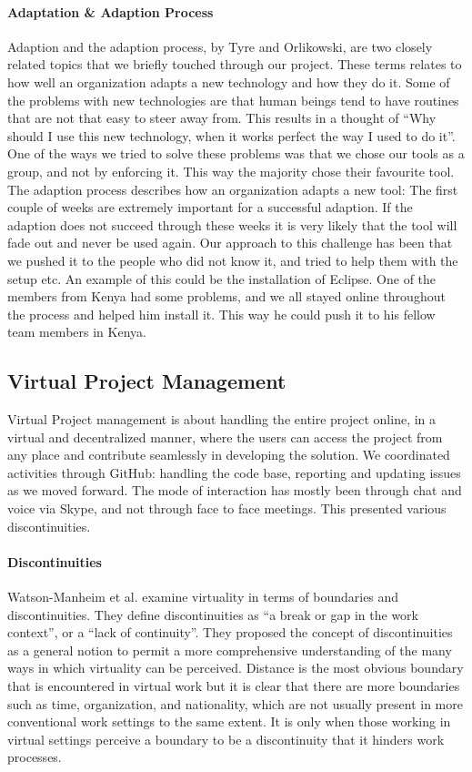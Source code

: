 \paragraph{Adaptation \& Adaption Process} \label{par:adaptationandadaptationprocess}
Adaption and the adaption process, by Tyre and Orlikowski, \cite{tyre1994windows} are two closely related topics that we briefly touched through our project. These terms relates to how well an organization adapts a new technology and how they do it. Some of the problems with new technologies are that human beings tend to have routines that are not that easy to steer away from. This results in a thought of ``Why should I use this new technology, when it works perfect the way I used to do it''. One of the ways we tried to solve these problems was that we chose our tools as a group, and not by enforcing it. This way the majority chose their favourite tool. The adaption process describes how an organization adapts a new tool: The first couple of weeks are extremely important for a successful adaption. If the adaption does not succeed through these weeks it is very likely that the tool will fade out and never be used again. Our approach to this challenge has been that we pushed it to the people who did not know it, and tried to help them with the setup etc. An example of this could be the installation of Eclipse. One of the members from Kenya had some problems, and we all stayed online throughout the process and helped him install it. This way he could push it to his fellow team members in Kenya.

\subsection{Virtual Project Management} \label{subsec:virtualprojectmanagement}
Virtual Project management is about handling the entire project online, in a virtual and decentralized manner, where the users can access the project from any place and contribute seamlessly in developing the solution. We coordinated activities through GitHub: handling the code base, reporting and updating issues as we moved forward. The mode of interaction has mostly been through chat and voice via Skype, and not through face to face meetings. This presented various discontinuities.

\paragraph{Discontinuities} \label{par:discontinuities}
Watson-Manheim et al. \cite{watson2007distance} examine virtuality in terms of boundaries and discontinuities. They define discontinuities as “a break or gap in the work context”, or a “lack of continuity”. They proposed the concept of discontinuities as a general notion to permit a more comprehensive understanding of the many ways in which virtuality can be perceived.
Distance is the most obvious boundary that is encountered in virtual work but it is clear that there are more boundaries such as time, organization, and nationality, which are not usually present in more conventional work settings to the same extent. It is only when those working in virtual settings perceive a boundary to be a discontinuity that it hinders work processes. 

